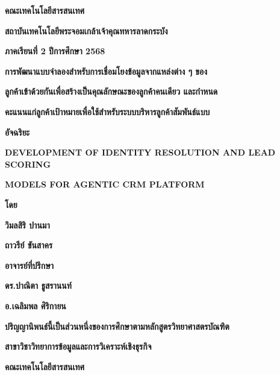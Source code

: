 \documentclass[12pt,a4paper]{report}
\begin{document}
\begin{center}\bfseries คณะเทคโนโลยีสารสนเทศ\end{center}
\begin{center}\bfseries สถาบันเทคโนโลยีพระจอมเกล้าเจ้าคุณทหารลาดกระบัง\end{center}
\begin{center}\bfseries ภาคเรียนที่ 2 ปีการศึกษา 2568\end{center}
\clearpage
\begin{center}\bfseries การพัฒนาแบบจำลองสำหรับการเชื่อมโยงข้อมูลจากแหล่งต่าง ๆ ของ\end{center}
\begin{center}\bfseries ลูกค้าเข้าด้วยกันเพื่อสร้างเป็นคุณลักษณะของลูกค้าคนเดียว และกำหนด\end{center}
\begin{center}\bfseries คะแนนแก่ลูกค้าเป้าหมายเพื่อใช้สำหรับระบบบริหารลูกค้าสัมพันธ์แบบ\end{center}
\begin{center}\bfseries อัจฉริยะ\end{center}
\begin{center}\bfseries DEVELOPMENT OF IDENTITY RESOLUTION AND LEAD SCORING\end{center}
\begin{center}\bfseries MODELS FOR AGENTIC CRM PLATFORM\end{center}
\begin{center}\bfseries โดย\end{center}
\begin{center}\bfseries วิมลสิริ ปานมา\end{center}
\begin{center}\bfseries ถาวรีย์ ขันสาคร\end{center}
\begin{center}\bfseries อาจารย์ที่ปรึกษา\end{center}
\begin{center}\bfseries ดร.ปาณิตา ธูสรานนท์\end{center}
\begin{center}\bfseries อ.เฉลิมพล ศิริกายน\end{center}
\begin{center}\bfseries ปริญญานิพนธ์นี้เป็นส่วนหนึ่งของการศึกษาตามหลักสูตรวิทยาศาสตรบัณฑิต\end{center}
\begin{center}\bfseries สาขาวิชาวิทยาการข้อมูลและการวิเคราะห์เชิงธุรกิจ\end{center}
\begin{center}\bfseries คณะเทคโนโลยีสารสนเทศ\end{center}
\end{document}
